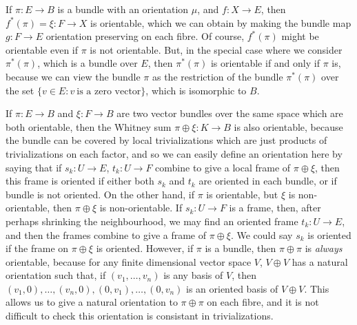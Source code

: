 \begin{example}
    If $\pi: E \to B$ is a bundle with an orientation $\mu$, and $f: X \to E$, then $f^*(\pi) = \xi: F \to X$ is orientable, which we can obtain by making the bundle map $g: F \to E$ orientation preserving on each fibre. Of course, $f^*(\pi)$ might be orientable even if $\pi$ is not orientable. But, in the special case where we consider $\pi^*(\pi)$, which is a bundle over $E$, then $\pi^*(\pi)$ is orientable if and only if $\pi$ is, because we can view the bundle $\pi$ as the restriction of the bundle $\pi^*(\pi)$ over the set $\{ v \in E: v\ \text{is a zero vector} \}$, which is isomorphic to $B$.
\end{example}

\begin{example}
    If $\pi: E \to B$ and $\xi: F \to B$ are two vector bundles over the same space which are both orientable, then the Whitney sum $\pi \oplus \xi: K \to B$ is also orientable, because the bundle can be covered by local trivializations which are just products of trivializations on each factor, and so we can easily define an orientation here by saying that if $s_k: U \to E$, $t_k: U \to F$ combine to give a local frame of $\pi \oplus \xi$, then this frame is oriented if either both $s_k$ and $t_k$ are oriented in each bundle, or if bundle is not oriented. On the other hand, if $\pi$ is orientable, but $\xi$ is non-orientable, then $\pi \oplus \xi$ is non-orientable. If $s_k: U \to F$ is a frame, then, after perhaps shrinking the neighbourhood, we may find an oriented frame $t_k: U \to E$, and then the frames combine to give a frame of $\pi \oplus \xi$. We could say $s_k$ is oriented if the frame on $\pi \oplus \xi$ is oriented. However, if $\pi$ is a bundle, then $\pi \oplus \pi$ is {\it always} orientable, because for any finite dimensional vector space $V$, $V \oplus V$ has a natural orientation such that, if $(v_1, \dots, v_n)$ is any basis of $V$, then $(v_1,0), \dots, (v_n,0), (0,v_1), \dots, (0,v_n)$ is an oriented basis of $V \oplus V$. This allows us to give a natural orientation to $\pi \oplus \pi$ on each fibre, and it is not difficult to check this orientation is consistant in trivializations.
\end{example}

